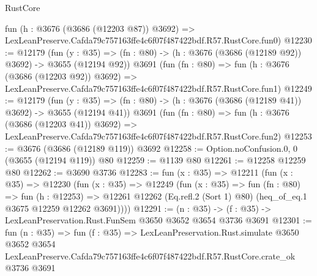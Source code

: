 \begin{lexlean}{RustCore}
\begin{coremodule}
    fun (h : @3676 (@3686 (@12203 @87)) @3692) =>
    LexLeanPreserve.Cafda79c757163ffe4c6f07f487422bdf.R57.RustCore.fun0)
@12230 := @12179
    (fun (y : @35) => (fn : @80) -> (h : @3676 (@3686 (@12189 @92)) @3692) -> @3655 (@12194 @92))
    @3691
    (fun (fn : @80) =>
    fun (h : @3676 (@3686 (@12203 @92)) @3692) =>
    LexLeanPreserve.Cafda79c757163ffe4c6f07f487422bdf.R57.RustCore.fun1)
@12249 := @12179
    (fun (y : @35) => (fn : @80) -> (h : @3676 (@3686 (@12189 @41)) @3692) -> @3655 (@12194 @41))
    @3691
    (fun (fn : @80) =>
    fun (h : @3676 (@3686 (@12203 @41)) @3692) =>
    LexLeanPreserve.Cafda79c757163ffe4c6f07f487422bdf.R57.RustCore.fun2)
@12253 := @3676 (@3686 (@12189 @119)) @3692
@12258 := Option.noConfusion.{0, 0} (@3655 (@12194 @119)) @80
@12259 := @1139 @80
@12261 := @12258 @12259 @80
@12262 := @3690 @3736
@12283 := fun (x : @35) =>
  @12211
    (fun (x : @35) =>
    @12230
      (fun (x : @35) =>
      @12249
        (fun (x : @35) =>
        fun (fn : @80) =>
        fun (h : @12253) =>
        @12261 @12262 (Eq.refl.{2} (Sort 1) @80) (heq_of_eq.{1} @3675 @12259 @12262 @3691))))
@12291 := (n : @35) -> (f : @35) -> LexLeanPreservation.Rust.FunSem @3650 @3652 @3654 @3736 @3691
@12301 := fun (n : @35) =>
  fun (f : @35) =>
  LexLeanPreservation.Rust.simulate
    @3650
    @3652
    @3654
    LexLeanPreserve.Cafda79c757163ffe4c6f07f487422bdf.R57.RustCore.crate_ok
    @3736
    @3691
\end{coremodule}
\end{lexlean}
